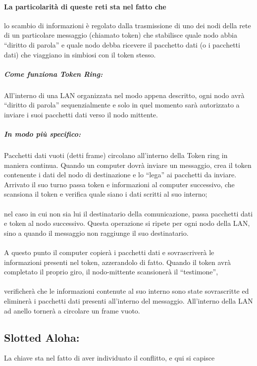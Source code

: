 \documentclass[12pt, a4paper, openany, twoside]{book}
\begin{document}
\paragraph{La particolarità di queste reti sta nel fatto che }lo scambio di 
informazioni è regolato dalla trasmissione di uno dei nodi della rete di un 
particolare messaggio (chiamato token) che stabilisce quale nodo abbia “diritto
di parola” e quale nodo debba ricevere il pacchetto dati (o i pacchetti dati) 
che viaggiano in simbiosi con il token stesso. 
\subparagraph{Come funziona Token Ring: }
All'interno di una LAN organizzata nel modo appena descritto, ogni nodo avrà 
“diritto di parola” sequenzialmente e solo in quel momento sarà autorizzato a 
inviare i suoi pacchetti dati verso il nodo mittente.	
\subparagraph{In modo più specifico: }Pacchetti dati vuoti (detti frame) 
circolano all'interno della Token ring in maniera continua. Quando un computer 
dovrà inviare un messaggio, crea il token contenente i dati del nodo di 
destinazione e lo “lega” ai pacchetti da inviare. Arrivato il suo turno passa 
token e informazioni al computer successivo, che scansiona il token e verifica
quale siano i dati scritti al suo interno; 
\paragraph{}
nel caso in cui non sia lui il 
destinatario della comunicazione, passa pacchetti dati e token al nodo 
successivo. Questa operazione si ripete per ogni nodo della LAN, sino a quando 
il messaggio non raggiunge il suo destinatario. 
\paragraph{}
A questo punto il computer 
copierà i pacchetti dati e sovrascriverà le informazioni presenti nel token,
azzerandolo di fatto. Quando il token avrà completato il proprio giro, il
nodo-mittente scansionerà il “testimone”, 
\paragraph{}
verificherà che le informazioni 
contenute al suo interno sono state sovrascritte ed eliminerà i pacchetti 
dati presenti all'interno del messaggio. All'interno della LAN ad anello 
tornerà a circolare un frame vuoto.	
\subsection{Slotted Aloha: }	
La chiave sta nel fatto di aver individuato il conflitto, e qui si capisce
\end{document}
